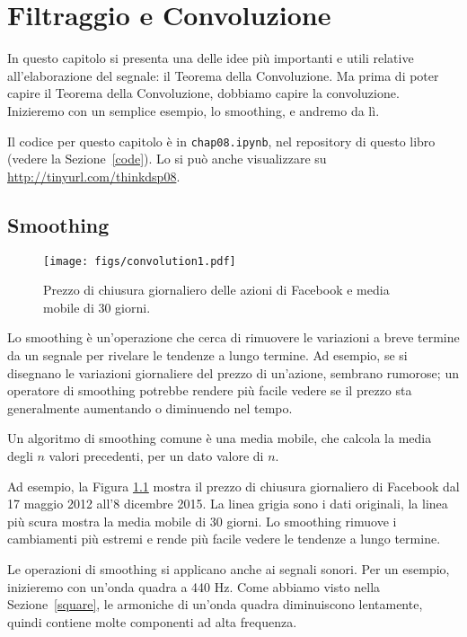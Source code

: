 \documentclass[12pt,a4paper]{book}
\begin{document}
\chapter{Filtraggio e Convoluzione} 

In questo capitolo si presenta una delle idee più importanti e utili relative all'elaborazione del segnale: il Teorema della Convoluzione. Ma prima di poter capire il Teorema della Convoluzione, dobbiamo capire la convoluzione. Inizieremo con un semplice esempio, lo smoothing, e andremo da lì.

Il codice per questo capitolo è in {\tt chap08.ipynb}, nel repository di questo libro (vedere la Sezione~\ref{code}). Lo si può anche visualizzare su \url{http://tinyurl.com/thinkdsp08}.

\section{Smoothing} \label{smoothing} 

\begin{figure} 

\centerline{\texttt{[image: figs/convolution1.pdf]}} \caption{Prezzo di chiusura giornaliero delle azioni di Facebook e media mobile di 30 giorni.} \label{fig.convolution1} \end{figure} 

Lo smoothing è un'operazione che cerca di rimuovere le variazioni a breve termine da un segnale per rivelare le tendenze a lungo termine. Ad esempio, se si disegnano le variazioni giornaliere del prezzo di un'azione, sembrano rumorose; un operatore di smoothing potrebbe rendere più facile vedere se il prezzo sta generalmente aumentando o diminuendo nel tempo.

Un algoritmo di smoothing comune è una media mobile, che calcola la media degli $n$ valori precedenti, per un dato valore di $n$.

Ad esempio, la Figura \ref{fig.convolution1} mostra il prezzo di chiusura giornaliero di Facebook dal 17 maggio 2012 all'8 dicembre 2015. La linea grigia sono i dati originali, la linea più scura mostra la media mobile di 30 giorni. Lo smoothing rimuove i cambiamenti più estremi e rende più facile vedere le tendenze a lungo termine.

Le operazioni di smoothing si applicano anche ai segnali sonori. Per un esempio, inizieremo con un'onda quadra a 440 Hz. Come abbiamo visto nella Sezione~\ref{square}, le armoniche di un'onda quadra diminuiscono lentamente, quindi contiene molte componenti ad alta frequenza.
\end{document}
